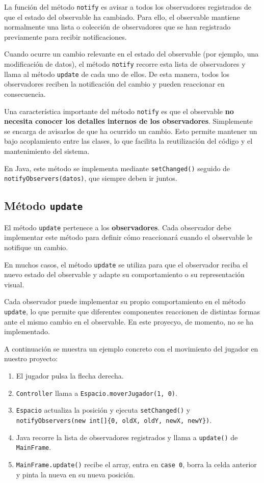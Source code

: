 \documentclass[12pt, a4paper]{article}
\begin{document}
La función del método \texttt{notify} es avisar a todos los observadores registrados de que el estado del observable ha cambiado. Para ello, el observable mantiene normalmente una lista o colección de observadores que se han registrado previamente para recibir notificaciones.

Cuando ocurre un cambio relevante en el estado del observable (por ejemplo, una modificación de datos), el método \texttt{notify} recorre esta lista de observadores y llama al método \texttt{update} de cada uno de ellos. De esta manera, todos los observadores reciben la notificación del cambio y pueden reaccionar en consecuencia.

Una característica importante del método \texttt{notify} es que el observable \textbf{no necesita conocer los detalles internos de los observadores}. Simplemente se encarga de avisarlos de que ha ocurrido un cambio. Esto permite mantener un bajo acoplamiento entre las clases, lo que facilita la reutilización del código y el mantenimiento del sistema.

En Java, este método se implementa mediante \texttt{setChanged()} seguido de \texttt{notifyObservers(datos)}, que siempre deben ir juntos.
\subsection{Método \texttt{update}}

El método \texttt{update} pertenece a los \textbf{observadores}. Cada observador debe implementar este método para definir cómo reaccionará cuando el observable le notifique un cambio.

En muchos casos, el método \texttt{update} se utiliza para que el observador reciba el nuevo estado del observable y adapte su comportamiento o su representación visual. 

Cada observador puede implementar su propio comportamiento en el método \texttt{update}, lo que permite que diferentes componentes reaccionen de distintas formas ante el mismo cambio en el observable. En este proyecyo, de momento, no se ha implementado.

A continuación se muestra un ejemplo concreto con el movimiento del jugador en nuestro proyecto:
 
\begin{enumerate}[leftmargin=2em]
    \item El jugador pulsa la flecha derecha.
    \item \texttt{Controller} llama a \texttt{Espacio.moverJugador(1, 0)}.
    \item \texttt{Espacio} actualiza la posición y ejecuta \texttt{setChanged()} y \texttt{notifyObservers(new int[]\{0, oldX, oldY, newX, newY\})}.
    \item Java recorre la lista de observadores registrados y llama a \texttt{update()} de \texttt{MainFrame}.
    \item \texttt{MainFrame.update()} recibe el array, entra en \texttt{case 0}, borra la celda anterior y pinta la nueva en su nueva posición.
\end{enumerate}
\end{document}
